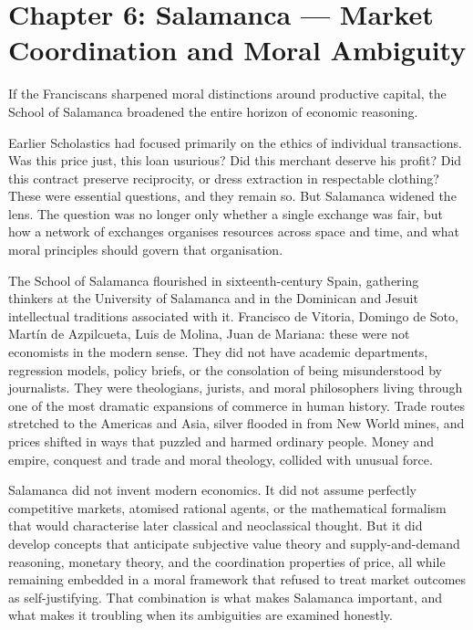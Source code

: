 \documentclass[11pt,a4paper,oneside]{book}
\begin{document}
\chapter*{Chapter 6: Salamanca --- Market Coordination and Moral Ambiguity}

If the Franciscans sharpened moral distinctions around productive capital, the School of Salamanca broadened the entire horizon of economic reasoning.

Earlier Scholastics had focused primarily on the ethics of individual transactions. Was this price just, this loan usurious? Did this merchant deserve his profit? Did this contract preserve reciprocity, or dress extraction in respectable clothing? These were essential questions, and they remain so. But Salamanca widened the lens. The question was no longer only whether a single exchange was fair, but how a network of exchanges organises resources across space and time, and what moral principles should govern that organisation.

The School of Salamanca flourished in sixteenth-century Spain, gathering thinkers at the University of Salamanca and in the Dominican and Jesuit intellectual traditions associated with it. Francisco de Vitoria, Domingo de Soto, Martín de Azpilcueta, Luis de Molina, Juan de Mariana: these were not economists in the modern sense. They did not have academic departments, regression models, policy briefs, or the consolation of being misunderstood by journalists. They were theologians, jurists, and moral philosophers living through one of the most dramatic expansions of commerce in human history. Trade routes stretched to the Americas and Asia, silver flooded in from New World mines, and prices shifted in ways that puzzled and harmed ordinary people. Money and empire, conquest and trade and moral theology, collided with unusual force.

Salamanca did not invent modern economics. It did not assume perfectly competitive markets, atomised rational agents, or the mathematical formalism that would characterise later classical and neoclassical thought. But it did develop concepts that anticipate subjective value theory and supply-and-demand reasoning, monetary theory, and the coordination properties of price, all while remaining embedded in a moral framework that refused to treat market outcomes as self-justifying. That combination is what makes Salamanca important, and what makes it troubling when its ambiguities are examined honestly.
\end{document}
